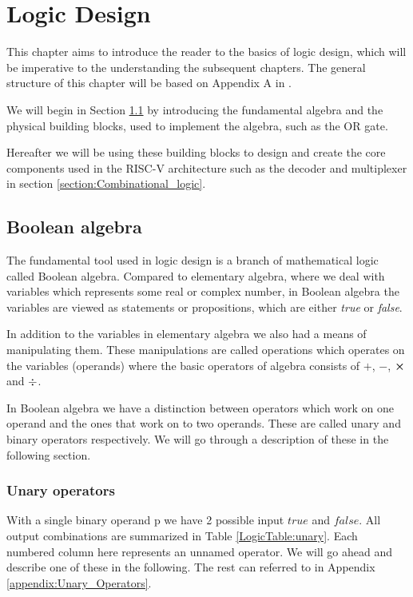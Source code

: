 \chapter{Logic Design}
    
    This chapter aims to introduce the reader to the basics of logic design, which will be imperative to the understanding the subsequent chapters. The general structure of this chapter will be based on Appendix A in \cite{riscVbook}. 
    
    We will begin in Section \ref{section:Boolean_algebra} by introducing the fundamental algebra and the physical building blocks, used to implement the algebra, such as the OR gate. 
    
    Hereafter we will be using these building blocks to design and create the core components used in the RISC-V architecture such as the decoder and multiplexer in section \ref{section:Combinational_logic}. 

    \section{Boolean algebra}\label{section:Boolean_algebra}
    
        The fundamental tool used in logic design is a branch of mathematical logic called Boolean algebra. Compared to elementary algebra, where we deal with variables which represents some real or complex number, in Boolean algebra the variables are viewed as statements or propositions, which are either \textit{true} or \textit{false}.
        
        In addition to the variables in elementary algebra we also had a means of manipulating them. These manipulations are called operations which operates on the variables (operands) where the basic operators of algebra consists of $+$, $-$, $\cross$ and $\divisionsymbol$.
        
        In Boolean algebra we have a distinction between operators which work on one operand and the ones that work on to two operands. These are called unary and binary operators respectively. We will go through a description of these in the following section. 
        
        \subsection{Unary operators}
        
            With a single binary operand p we have 2 possible input $true$ and $false$. All output combinations are summarized in Table \ref{LogicTable:unary}. Each numbered column here represents an unnamed operator. We will go ahead and describe one of these in the following. The rest can referred to in Appendix \ref{appendix:Unary_Operators}. 
            
